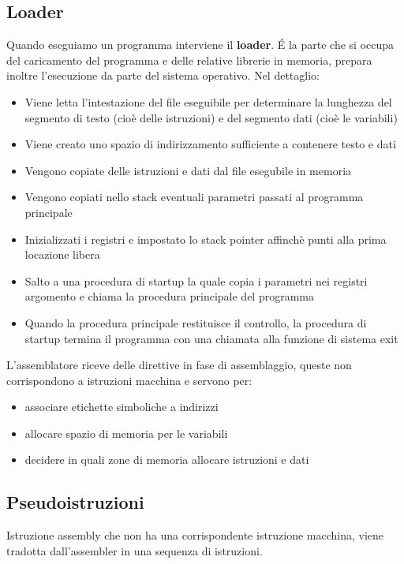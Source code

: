 \documentclass[12pt, a4paper, openany]{book}
\begin{document}
\subsection{Loader}
Quando eseguiamo un programma interviene il \textbf{loader}.
\'E la parte che si occupa del caricamento del programma e delle relative librerie in memoria,
prepara inoltre l'esecuzione da parte del sistema operativo.
Nel dettaglio: \begin{itemize}
    \item Viene letta l'intestazione del file eseguibile per determinare la lunghezza
    del segmento di testo (cioè delle istruzioni) e del segmento dati (cioè le variabili)
    \item Viene creato uno spazio di indirizzamento sufficiente a contenere testo e dati
    \item Vengono copiate delle istruzioni e dati dal file esegubile in memoria
    \item Vengono copiati nello stack eventuali parametri passati al programma principale
    \item Inizializzati i registri e impostato lo stack pointer affinchè punti alla prima
    locazione libera
    \item Salto a una procedura di startup la quale copia i parametri nei registri argomento
    e chiama la procedura principale del programma
    \item Quando la procedura principale restituisce il controllo, la procedura di
    startup termina il programma con una chiamata alla funzione di sistema exit
\end{itemize}

L'assemblatore riceve delle direttive in fase di assemblaggio, queste non corrispondono
a istruzioni macchina e servono per: \begin{itemize}
    \item associare etichette simboliche a indirizzi
    \item allocare spazio di memoria per le variabili
    \item decidere in quali zone di memoria allocare istruzioni e dati
\end{itemize}

\subsection{Pseudoistruzioni}
Istruzione assembly che non ha una corrispondente istruzione macchina, viene tradotta
dall'assembler in una sequenza di istruzioni.
\end{document}
